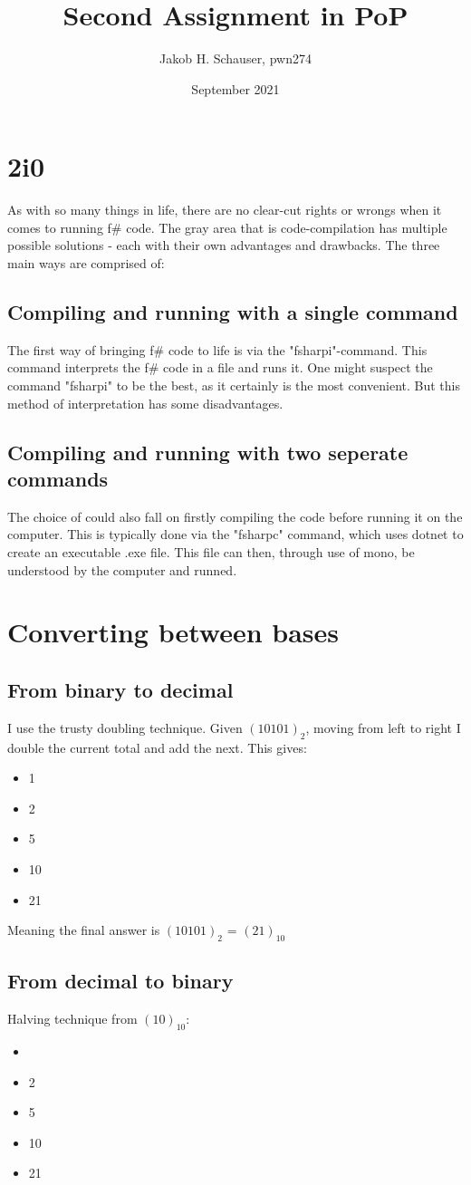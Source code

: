 \documentclass[12pt, letterpaper]{article}
\title{Second Assignment in PoP}
\author{Jakob H. Schauser, pwn274}
\date{September 2021}
\begin{document}
\maketitle

\section{2i0}
As with so many things in life, there are no clear-cut rights or wrongs when it comes to running f\# code. The gray area that is code-compilation has multiple possible solutions
 - each with their own advantages and drawbacks. The three main ways are comprised of:
\subsection{Compiling and running with a single command}
The first way of bringing f\# code to life is via the "fsharpi"-command. This command interprets the f\# code in a file and runs it.
One might suspect the command "fsharpi" to be the best, as it certainly is the most convenient. But this method of interpretation has some disadvantages.
\subsection{Compiling and running with two seperate commands}
The choice of could also fall on firstly compiling the code before running it on the computer. This is typically done via the "fsharpc" command, which uses dotnet to create an 
executable .exe file. This file can then, through use of mono, be understood by the computer and runned. 

\section{Converting between bases}

\subsection{From binary to decimal}
I use the trusty doubling technique. Given $(10101)_2$, moving from left to right I double the current total and add the next. This gives:
\begin{itemize}
    \item{1}
    \item{2}
    \item{5}
    \item{10}
    \item{21}
\end{itemize}
Meaning the final answer is $(10101)_2$ = $(21)_{10}$

\subsection{From decimal to binary}
Halving technique from $(10)_{10}$:
\begin{itemize}
    \item{}
    \item{2}
    \item{5}
    \item{10}
    \item{21}
\end{itemize}
\end{document}
